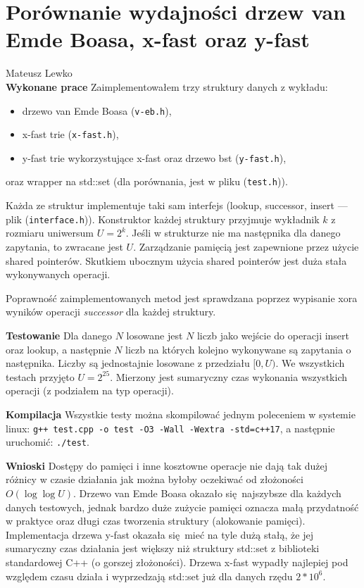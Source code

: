 \documentclass{article}
\begin{document}
\section*{Porównanie wydajności drzew van Emde Boasa, x-fast oraz y-fast}
Mateusz Lewko \\

\textbf{Wykonane prace}
Zaimplementowałem trzy struktury danych z wykładu:

\begin{itemize}
  \item drzewo van Emde Boasa (\texttt{v-eb.h}),
  \item x-fast trie (\texttt{x-fast.h}),
  \item y-fast trie wykorzystujące x-fast oraz drzewo bst (\texttt{y-fast.h}),
\end{itemize}
oraz wrapper na std::set (dla porównania, jest w pliku (\texttt{test.h})).

Każda ze struktur implementuje taki sam interfejs (lookup, successor,
insert --- plik (\texttt{interface.h})).
Konstruktor każdej struktury przyjmuje wykładnik $k$ z rozmiaru uniwersum $U = 2^k$.
Jeśli w strukturze nie ma następnika dla danego zapytania, to zwracane jest $U$.
Zarządzanie pamięcią jest zapewnione przez użycie shared pointerów. Skutkiem ubocznym
użycia shared pointerów jest duża stała wykonywanych operacji.

Poprawność zaimplementowanych metod jest sprawdzana poprzez wypisanie xora
wyników operacji \textit{successor} dla każdej struktury.

\textbf{Testowanie}
Dla danego $N$ losowane jest $N$ liczb jako wejście do operacji insert oraz
lookup, a następnie $N$ liczb na
których kolejno wykonywane są zapytania o następnika. Liczby są
jednostajnie losowane z przedziału $[0, U)$. We wszystkich testach przyjęto
$U = 2^{25}$. Mierzony jest sumaryczny czas wykonania wszystkich operacji
(z podziałem na typ operacji).

\textbf{Kompilacja} Wszystkie testy można skompilować jednym poleceniem w
systemie linux: \texttt{g++ test.cpp -o test -O3 -Wall -Wextra -std=c++17},
a następnie uruchomić: \texttt{./test}.

\textbf{Wnioski} Dostępy do pamięci i inne kosztowne operacje nie dają tak
dużej różnicy w czasie działania jak można byłoby oczekiwać od złożoności $O(\log \log U)$.
Drzewo van Emde Boasa okazało się najszybsze dla każdych danych testowych, jednak
bardzo duże zużycie pamięci oznacza małą przydatność w praktyce oraz długi czas
tworzenia struktury (alokowanie pamięci). 
Implementacja drzewa y-fast okazała się mieć na tyle dużą
stałą, że jej sumaryczny czas działania jest większy niż struktury std::set z biblioteki
standardowej C++ (o gorszej złożoności). 
Drzewa x-fast wypadły najlepiej pod względem czasu działa i wyprzedzają std::set już
dla danych rzędu $2 * 10^6$.
\end{document}
